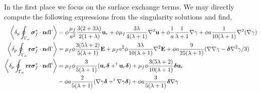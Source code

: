 In the first place we focus on the surface exchange terms. 
We may directly compute the following expressions from the singularity solutions and find, 
\begin{align}
    \pSavg{\bm\sigma_f^*\cdot \textbf{n}} &
    =
    \phi
    \frac{\mu_f}{a^2}
    \frac{3(2+3\lambda)}{2(1+\lambda)}\textbf{u}_r
    + \phi\mu_f  \frac{3\lambda}{4(\lambda +1)} \grad^2 \textbf{u}%
    + \phi \frac{1}{a}\frac{1}{\lambda +1} \grad \gamma
    + \phi a \frac{1}{10(\lambda +1)}\grad^2(\grad\gamma)
    \label{eq:drag_forces}
    \\
    \pSavg{\textbf{r}\bm\sigma_f^*\cdot \textbf{n}} &
    = \mu_f \phi 
    \frac{3(5\lambda +2)}{5(\lambda +1)}\textbf{E}
    + \mu_f a^2 \phi \frac{3\lambda}{10(\lambda+1)}\grad^2  \textbf{E}
    + \phi a \frac{9}{25(\lambda +1)}(\grad\grad \gamma- \bm\delta\grad^2 \gamma/3)
    \\
    \pSavg{\textbf{rr}\bm\sigma_f^*\cdot \textbf{n}} &
    =
    \mu_f \phi \frac{3}{5(\lambda +1)} (\textbf{u}_r \bm\delta + ^\dagger\textbf{u}_r\bm\delta )
    + \mu_f \phi \frac{3(5\lambda +2)}{10(\lambda+1)}\bm\delta \textbf{u}_r\nonumber\\
    &
    - \phi a\frac{2}{5(\lambda+1)}(\grad \gamma \bm\delta+  ^\dagger \grad \gamma\bm\delta)
    + \phi a\frac{3}{5(\lambda+1)} \bm\delta \grad \gamma
\end{align}
